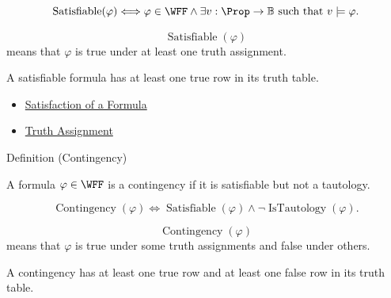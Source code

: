 \begin{remark*}
\[
\operatorname{Satisfiable}(\varphi)
\Longleftrightarrow
\varphi\in\WFF
\land
\exists v:\Prop\to\mathbb{B}\text{ such that }v\models\varphi.
\]
\end{remark*}

\begin{remark*}
\[
\operatorname{Satisfiable}(\varphi)
\]
means that \(\varphi\) is true under at least one truth assignment.
\end{remark*}

\begin{remark*}[Interpretation]
A satisfiable formula has at least one true row in its truth table.
\end{remark*}

\begin{dependencies}
\begin{itemize}
  \item \hyperref[def:satisfaction-propositional-formula]{Satisfaction of a Formula}
  \item \hyperref[def:truth-assignment-propositional-logic]{Truth Assignment}
\end{itemize}
\end{dependencies}
\begin{definitionbox}{Definition (Contingency)}
\begin{definition}[Contingency]
\label{def:contingency-propositional-logic}
A formula \(\varphi\in\WFF\) is a contingency if it is satisfiable but not a tautology.
\end{definition}
\end{definitionbox}

\begin{remark*}
\[
\operatorname{Contingency}(\varphi)
\Longleftrightarrow
\operatorname{Satisfiable}(\varphi)
\land
\neg \operatorname{IsTautology}(\varphi).
\]
\end{remark*}

\begin{remark*}
\[
\operatorname{Contingency}(\varphi)
\]
means that \(\varphi\) is true under some truth assignments and false under others.
\end{remark*}

\begin{remark*}[Interpretation]
A contingency has at least one true row and at least one false row in its truth table.
\end{remark*}

